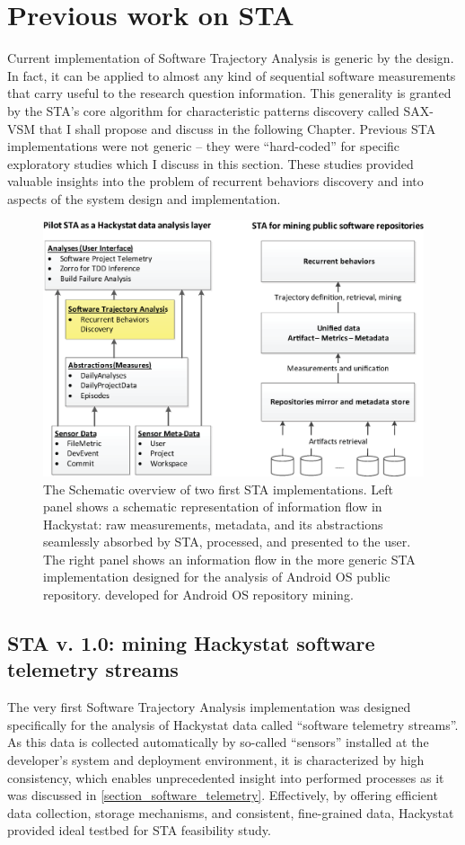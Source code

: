 \section{Previous work on STA}
Current implementation of Software Trajectory Analysis is generic by the design. In fact, it can be applied 
to almost any kind of sequential software measurements that carry useful to the research question information. 
This generality is granted by the STA's core algorithm for characteristic patterns discovery called SAX-VSM 
that I shall propose and discuss in the following Chapter. 
Previous STA implementations were not generic -- they were ``hard-coded'' for specific exploratory studies 
which I discuss in this section. These studies provided valuable insights into the problem of recurrent 
behaviors discovery and into aspects of the system design and implementation.

\begin{figure}[t]
   \centering
   \includegraphics[width=150mm]{figures/STA12-schema-draft.eps}
   \caption{The Schematic overview of two first STA implementations. 
   Left panel shows a schematic representation of information flow in Hackystat: raw measurements, metadata, and its 
   abstractions seamlessly absorbed by STA, processed, and presented to the user.
   The right panel shows an information flow in the more generic STA implementation designed for the analysis of 
   Android OS public repository. developed for Android OS repository mining.}
   \label{fig:STA12-schema}
\end{figure}

\subsection{STA v. 1.0: mining Hackystat software telemetry streams}
The very first Software Trajectory Analysis implementation was designed specifically for the analysis of Hackystat 
data called ``software telemetry streams''. As this data is collected automatically by so-called ``sensors'' installed 
at the developer's system and deployment environment, it is characterized by high consistency, which enables 
unprecedented insight into performed processes as it was discussed in \ref{section_software_telemetry}. 
Effectively, by offering efficient data collection, storage mechanisms, and consistent, fine-grained data, 
Hackystat provided ideal testbed for STA feasibility study.

